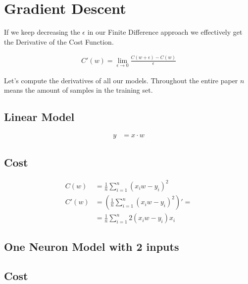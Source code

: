 \documentclass{article}
\begin{document}
\section{Gradient Descent}

If we keep decreasing the $\epsilon$ in our Finite Difference approach we effectively get the Derivative of the Cost Function.

\begin{align}
  C'(w) = \lim_{\epsilon \to 0}\frac{C(w + \epsilon) - C(w)}{\epsilon}
\end{align}

Let's compute the derivatives of all our models. Throughout the entire paper $n$ means the amount of samples in the training set.

\subsection{Linear Model}

\def\d{2.0}

\begin{center}
\end{center}

\begin{align}
  y &= x \cdot w
\end{align}

\subsection{Cost}

\begin{align}
  C(w) &= \frac{1}{n}\sum_{i=1}^{n}(x_{i}w -y_{i})^2 \\
  C'(w) 
       &= \left(\frac{1}{n}{\sum_{i=1}^{n}(x_{i}w -y_{i})^2}\right)' = \\
       &= \frac{1}{n}\sum_{i=1}^{n}2(x_iw - y_i)x_i
\end{align}

\subsection{One Neuron Model with 2 inputs}

\subsection{Cost}
\end{document}
